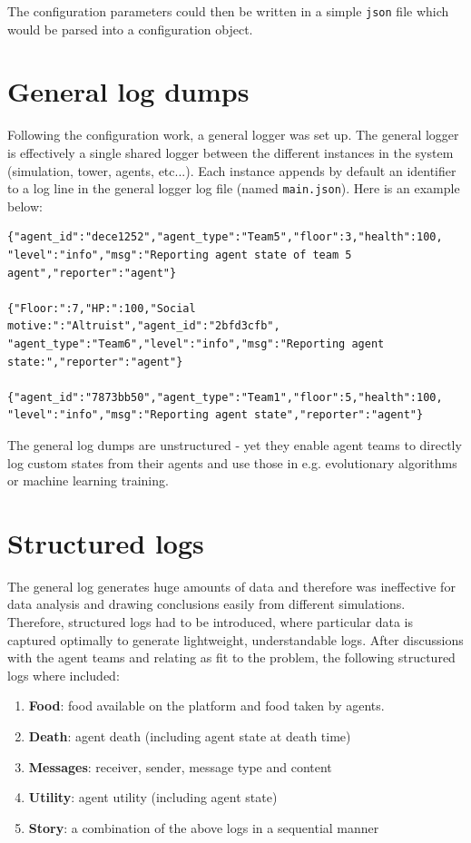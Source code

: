The configuration parameters could then be written in a simple \texttt{json} file which would be parsed into a configuration object.

\section{General log dumps}

Following the configuration work, a general logger was set up. The general logger is effectively a single shared logger between the different instances in the system (simulation, tower, agents, etc...). Each instance appends by default an identifier to a log line in the general logger log file (named \texttt{main.json}). Here is an example below:

\begin{verbatim}
{"agent_id":"dece1252","agent_type":"Team5","floor":3,"health":100,
"level":"info","msg":"Reporting agent state of team 5 agent","reporter":"agent"}

{"Floor:":7,"HP:":100,"Social motive:":"Altruist","agent_id":"2bfd3cfb",
"agent_type":"Team6","level":"info","msg":"Reporting agent state:","reporter":"agent"}

{"agent_id":"7873bb50","agent_type":"Team1","floor":5,"health":100,
"level":"info","msg":"Reporting agent state","reporter":"agent"}
\end{verbatim}

The general log dumps are unstructured - yet they enable agent teams to directly log custom states from their agents and use those in e.g. evolutionary algorithms or machine learning training.

\section{Structured logs}

The general log generates huge amounts of data and therefore was ineffective for data analysis and drawing conclusions easily from different simulations. Therefore, structured logs had to be introduced, where particular data is captured optimally to generate lightweight, understandable logs. After discussions with the agent teams and relating as fit to the problem, the following structured logs where included:

\begin{enumerate}
    \item \textbf{Food}: food available on the platform and food taken by agents.
    \item \textbf{Death}: agent death (including agent state at death time)
    \item \textbf{Messages}: receiver, sender, message type and content
    \item \textbf{Utility}: agent utility (including agent state)
    \item \textbf{Story}: a combination of the above logs in a sequential manner
\end{enumerate}

